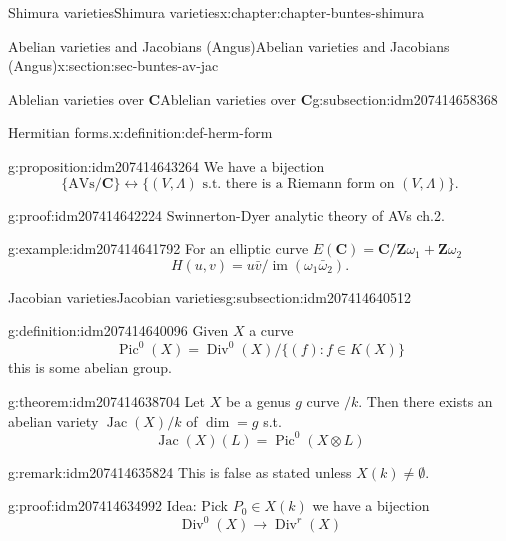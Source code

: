 \documentclass[oneside,10pt,]{book}
\numberwithin{equation}{section}
\newcommand{\ZZ}{\mathbf{Z}}
\newcommand{\CC}{\mathbf{C}}
\DeclareMathOperator{\divisors}{Div}
\DeclareMathOperator{\Pic}{Pic}
\DeclareMathOperator{\Jac}{Jac}
\DeclareMathOperator{\im}{im}
\begin{document}
\begin{chapterptx}{Shimura varieties}{}{Shimura varieties}{}{}{x:chapter:chapter-buntes-shimura}
\begin{sectionptx}{Abelian varieties and Jacobians (Angus)}{}{Abelian varieties and Jacobians (Angus)}{}{}{x:section:sec-buntes-av-jac}
\begin{subsectionptx}{Ablelian varieties over \(\CC\)}{}{Ablelian varieties over \(\CC\)}{}{}{g:subsection:idm207414658368}
\begin{definition}{Hermitian forms.}{x:definition:def-herm-form}
\end{definition}
\begin{proposition}{}{}{g:proposition:idm207414643264}%
We have a bijection%
\begin{equation*}
\{\text{AVs}/\CC\} \leftrightarrow \{(V,\Lambda)\text{ s.t. there is a Riemann form on } (V, \Lambda)\}\text{.}
\end{equation*}
%
\end{proposition}
\begin{proofptx}{}{g:proof:idm207414642224}
Swinnerton-Dyer analytic theory of AVs ch.2.%
\end{proofptx}
\begin{example}{}{g:example:idm207414641792}%
For an elliptic curve \(E(\CC) = \CC/ \ZZ \omega_1 + \ZZ \omega_2\)%
\begin{equation*}
H(u,v) = u\bar v/ \im(\omega_1 \bar \omega_2)\text{.}
\end{equation*}
%
\end{example}
\end{subsectionptx}
%
%
\typeout{************************************************}
\typeout{************************************************}
%
\begin{subsectionptx}{Jacobian varieties}{}{Jacobian varieties}{}{}{g:subsection:idm207414640512}
\begin{definition}{}{g:definition:idm207414640096}%
Given \(X\) a curve%
\begin{equation*}
\Pic^0(X) = \divisors^0(X)/\{(f) : f \in K(X)\}
\end{equation*}
this is some abelian group.%
\end{definition}
\begin{theorem}{}{}{g:theorem:idm207414638704}%
Let \(X\) be a genus \(g\) curve \(/k\). Then there exists an abelian variety \(\Jac(X)/k\) of \(\dim = g\) s.t.%
\begin{equation*}
\Jac(X)(L) = \Pic^0(X\otimes L)
\end{equation*}
%
\end{theorem}
\begin{remark}{}{g:remark:idm207414635824}%
This is false as stated unless \(X(k) \ne \emptyset\).%
\end{remark}
\begin{proofptx}{}{g:proof:idm207414634992}
Idea: Pick \(P_0 \in X(k)\) we have a bijection%
\begin{equation*}
\divisors^0(X) \to \divisors^r(X)
\end{equation*}

\end{proofptx}
\end{subsectionptx}
\end{sectionptx}
\end{chapterptx}
\end{document}
